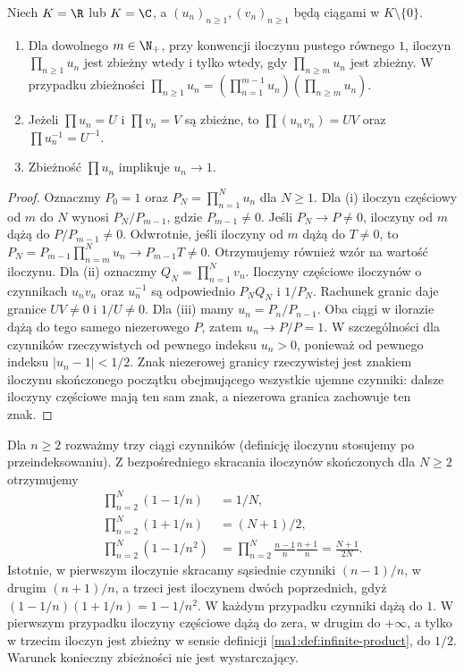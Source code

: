 \begin{twierdzenie}
\label{ma1:thm:product-elementary}
Niech $K=\R$ lub $K=\C$, a $(u_n)_{n\ge1},(v_n)_{n\ge1}$ będą ciągami w $K\setminus\{0\}$.
\begin{enumerate}[label=(\roman*)]
\item Dla dowolnego $m\in\N_+$, przy konwencji iloczynu pustego równego $1$, iloczyn $\prod_{n\ge1}u_n$ jest zbieżny wtedy i tylko wtedy, gdy $\prod_{n\ge m}u_n$ jest zbieżny. W przypadku zbieżności
$\prod_{n\ge1}u_n=(\prod_{n=1}^{m-1}u_n)(\prod_{n\ge m}u_n)$.
\item Jeżeli $\prod u_n=U$ i $\prod v_n=V$ są zbieżne, to $\prod(u_nv_n)=UV$ oraz $\prod u_n^{-1}=U^{-1}$.
\item Zbieżność $\prod u_n$ implikuje $u_n\to1$.
\end{enumerate}
\end{twierdzenie}
\begin{proof}
Oznaczmy $P_0=1$ oraz $P_N=\prod_{n=1}^N u_n$ dla $N\ge1$. Dla (i) iloczyn częściowy od $m$ do $N$ wynosi $P_N/P_{m-1}$, gdzie $P_{m-1}\ne0$. Jeśli $P_N\to P\ne0$, iloczyny od $m$ dążą do $P/P_{m-1}\ne0$. Odwrotnie, jeśli iloczyny od $m$ dążą do $T\ne0$, to $P_N=P_{m-1}\prod_{n=m}^N u_n\to P_{m-1}T\ne0$. Otrzymujemy również wzór na wartość iloczynu. Dla (ii) oznaczmy $Q_N=\prod_{n=1}^N v_n$. Iloczyny częściowe iloczynów o czynnikach $u_nv_n$ oraz $u_n^{-1}$ są odpowiednio $P_NQ_N$ i $1/P_N$. Rachunek granic daje granice $UV\ne0$ i $1/U\ne0$. Dla (iii) mamy $u_n=P_n/P_{n-1}$. Oba ciągi w ilorazie dążą do tego samego niezerowego $P$, zatem $u_n\to P/P=1$. W szczególności dla czynników rzeczywistych od pewnego indeksu $u_n>0$, ponieważ od pewnego indeksu $|u_n-1|<1/2$. Znak niezerowej granicy rzeczywistej jest znakiem iloczynu skończonego początku obejmującego wszystkie ujemne czynniki: dalsze iloczyny częściowe mają ten sam znak, a niezerowa granica zachowuje ten znak.
\end{proof}
\begin{przyklad}
\label{ma1:ex:telescoping-products}
Dla $n\ge2$ rozważmy trzy ciągi czynników (definicję iloczynu stosujemy po przeindeksowaniu). Z bezpośredniego skracania iloczynów skończonych dla $N\ge2$ otrzymujemy
\[
\begin{aligned}
 \prod_{n=2}^N(1-1/n)&=1/N,\\
 \prod_{n=2}^N(1+1/n)&=(N+1)/2,\\
 \prod_{n=2}^N(1-1/n^2)&=
 \prod_{n=2}^N\frac{n-1}{n}\frac{n+1}{n}
 =\frac{N+1}{2N}.
\end{aligned}
\]
Istotnie, w pierwszym iloczynie skracamy sąsiednie czynniki $(n-1)/n$, w drugim $(n+1)/n$, a trzeci jest iloczynem dwóch poprzednich, gdyż $(1-1/n)(1+1/n)=1-1/n^2$. W każdym przypadku czynniki dążą do $1$. W pierwszym przypadku iloczyny częściowe dążą do zera, w drugim do $+\infty$, a tylko w trzecim iloczyn jest zbieżny w sensie definicji \ref{ma1:def:infinite-product}, do $1/2$. Warunek konieczny zbieżności nie jest wystarczający.
\end{przyklad}

